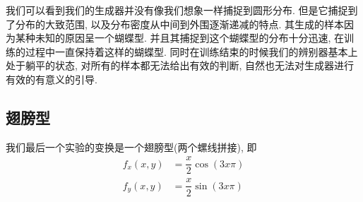\documentclass[lang=cn,11pt]{elegantpaper}
\begin{document}
我们可以看到我们的生成器并没有像我们想象一样捕捉到圆形分布. 但是它捕捉到了分布的大致范围, 以及分布密度从中间到外围逐渐递减的特点. 其生成的样本因为某种未知的原因呈一个蝴蝶型. 并且其捕捉到这个蝴蝶型的分布十分迅速, 在训练的过程中一直保持着这样的蝴蝶型. 同时在训练结束的时候我们的辨别器基本上处于躺平的状态, 对所有的样本都无法给出有效的判断, 自然也无法对生成器进行有效的有意义的引导.



\subsection{翅膀型}

我们最后一个实验的变换是一个翅膀型(两个螺线拼接), 即
\begin{align}
	f_x(x,y) &= \dfrac{x}{2} \cos (3x\pi) \\
	f_y(x,y) &= \dfrac{x}{2} \sin (3x\pi)
\end{align}
\end{document}
